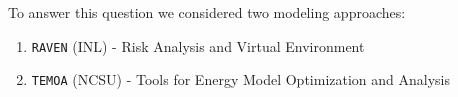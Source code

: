 \begin{frame}
    To answer this question we considered two modeling approaches:
    \begin{enumerate}
      \item \texttt{RAVEN} (INL) - Risk Analysis and Virtual Environment
      \item \texttt{TEMOA} (NCSU) - Tools for Energy Model Optimization and Analysis
    \end{enumerate}
\end{frame}
